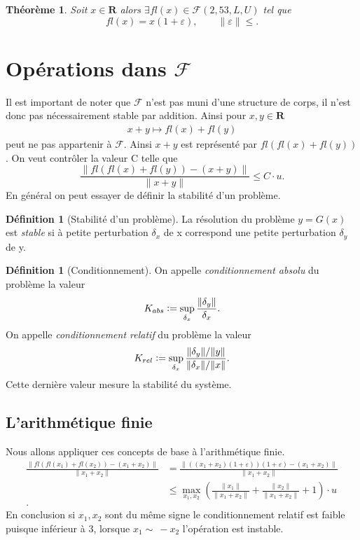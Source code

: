 \documentclass[12pt]{book}
\newcommand{\defeq}{\vcentcolon=}
\newtheorem{theorem}[lemma]{Théorème}
\theoremstyle{definition}
\newtheorem{definition}[lemma]{Définition}
\theoremstyle{remark}
\begin{document}
	\begin{theorem}
		Soit $x \in \mathbf{R}$ alors $\exists fl(x) \in \mathcal{F}(2,53,L,U)$ tel que \[
			fl(x) = x(1+\varepsilon), \qquad \|\varepsilon\| \le
		.\] 
	\end{theorem}
	\section{Opérations dans $\mathcal{F}$}
	Il est important de noter que $\mathcal{F}$ n'est pas muni d'une structure de corps, il n'est donc pas nécessairement stable par addition. Ainsi pour $x,y \in \mathbf{R}$
	\begin{align*}
		x+ y \longmapsto fl(x) + fl(y)	
	\end{align*} peut ne pas appartenir à $\mathcal{F}$.
	Ainsi $x+y$ est représenté par  $fl(fl(x)+fl(y))$.
	On veut contrôler la valeur C telle que \[
		\frac{\|fl(fl(x)+fl(y)) -(x+y)\|}{\|x+y\|} \le C\cdot u
	.\] 
	En général on peut essayer de définir la stabilité d'un problème.

	\begin{definition}[Stabilité d'un problème]
		La résolution du problème $y = G(x)$ est \emph{stable} si à petite perturbation $\delta_x$ de x correspond une petite perturbation $\delta_y$ de y. 
	\end{definition}
	\begin{definition}[Conditionnement]
		On appelle \emph{conditionnement absolu} du problème la valeur \[
			K_{abs} \defeq \sup_{\delta_x}\frac{\|\delta_y\|}{\delta_x}
		.\] 	
		On appelle \emph{conditionnement relatif} du problème la valeur \[
			K_{rel} \defeq \sup_{\delta_x} \frac{\|\delta_y\|/\|y\|}{\|\delta_x\|/\|x\|}
		.\] Cette dernière valeur mesure la stabilité du système. 
	\end{definition}
	\subsection{L'arithmétique finie}
	Nous allons appliquer ces concepts de base à l'arithmétique finie.
	\begin{align*}
		\frac{\|fl(fl(x_1)+fl(x_2))-(x_1+x_2)\|}{\|x_1+x_2\|} &= \frac{\|((x_1+x_2)(1+\varepsilon))(1+\varepsilon) - (x_1+x_2)\|}{\|x_1+x_2\|} \\
								      &\le \max_{x_1,x_2}(\frac{\|x_1\|}{\|x_1+x_2\|} + \frac{\|x_2\|}{\|x_1+x_2\|} +1)\cdot u \\
	.\end{align*}
	En conclusion si $x_1,x_2$ sont du même signe le conditionnement relatif est faible puisque inférieur à 3, lorsque $x_1 \sim~-x_2$ l'opération est instable. 
\end{document}
